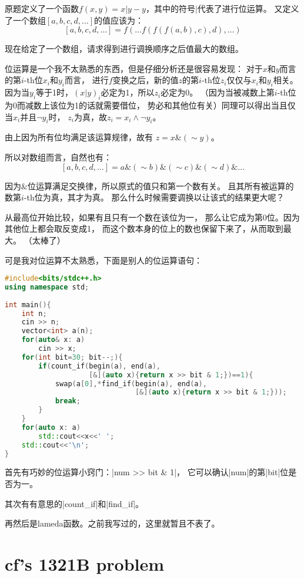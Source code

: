 原题定义了一个函数$f(x, y)=x|y-y$，其中的符号$|$代表了进行位运算。
又定义了一个数组$[a, b, c, d, \ldots]$的值应该为：
$$[a, b, c, d, \ldots] = f(\ldots f(f(f(a, b), c), d), \ldots)$$

现在给定了一个数组，请求得到进行调换顺序之后值最大的数组。

位运算是一个我不太熟悉的东西，但是仔细分析还是很容易发现：
对于$x$和$y$而言的第$i$-th位$x_i$和$y_i$而言，
进行$f$变换之后，新的值$z$的第$i$-th位$z_i$仅仅与$x_i$和$y_i$相关。
因为当$y_i$等于1时，$(x|y)_i$必定为1，所以$z_i$必定为0。
（因为当被减数上第$i$-th位为0而减数上该位为1的话就需要借位，
势必和其他位有关）同理可以得出当且仅当$x_i$并且$\lnot y_i$时，
$z_i$为真，故$z_i=x_i\land\lnot y_i$。

由上因为所有位均满足该运算规律，故有
$z=x\&(\sim y)$。

所以对数组而言，自然也有：
$$[a, b, c, d, \ldots] = a\&(\sim b)\&(\sim c)\&(\sim d)\&\ldots$$

因为$\&$位运算满足交换律，所以原式的值只和第一个数有关。
且其所有被运算的数第$i$-th位为真，其才为真。
那么什么时候需要调换以让该式的结果更大呢？

从最高位开始比较，如果有且只有一个数在该位为一，
那么让它成为第0位。因为其他位上都会取反变成1，
而这个数本身的位上的数也保留下来了，从而取到最大。
（太棒了）

可是我对位运算不太熟悉，下面是别人的位运算语句：
\begin{lstlisting}[language=C++]
#include<bits/stdc++.h>
using namespace std;
 
int main(){
    int n;
    cin >> n;
    vector<int> a(n);
    for(auto& x: a)
        cin >> x;
    for(int bit=30; bit--;){
        if(count_if(begin(a), end(a),
                    [&](auto x){return x >> bit & 1;})==1){
            swap(a[0],*find_if(begin(a), end(a),
                               [&](auto x){return x >> bit & 1;}));
            break;
        }
    }
    for(auto x: a)
        std::cout<<x<<' ';
    std::cout<<'\n';
}
\end{lstlisting}

首先有巧妙的位运算小窍门：\vb|num >> bit & 1|，
它可以确认\vb|num|的第\vb|bit|位是否为一。

其次有有意思的\vb|count_if|和\vb|find_if|。

再然后是lameda函数。之前我写过的，这里就暂且不表了。


\section{cf's 1321B problem}

